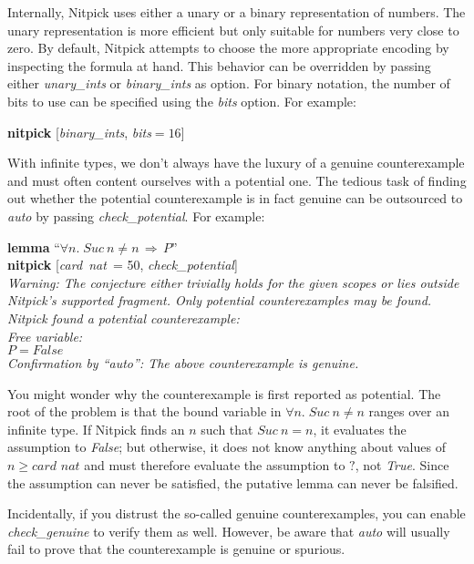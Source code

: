 \documentclass[a4paper,12pt]{article}
\def\unk{{?}}
\begin{document}
Internally, Nitpick uses either a unary or a binary representation of numbers.
The unary representation is more efficient but only suitable for numbers very
close to zero. By default, Nitpick attempts to choose the more appropriate
encoding by inspecting the formula at hand. This behavior can be overridden by
passing either \textit{unary\_ints} or \textit{binary\_ints} as option. For
binary notation, the number of bits to use can be specified using
the \textit{bits} option. For example:

\prew
\textbf{nitpick} [\textit{binary\_ints}, \textit{bits}${} = 16$]
\postw

With infinite types, we don't always have the luxury of a genuine counterexample
and must often content ourselves with a potential one. The tedious task of
finding out whether the potential counterexample is in fact genuine can be
outsourced to \textit{auto} by passing \textit{check\_potential}. For example:

\prew
\textbf{lemma} ``$\forall n.\; \textit{Suc}~n \mathbin{\not=} n \,\Longrightarrow\, P$'' \\
\textbf{nitpick} [\textit{card~nat}~= 50, \textit{check\_potential}] \\[2\smallskipamount]
\slshape Warning: The conjecture either trivially holds for the given scopes or lies outside Nitpick's supported
fragment. Only potential counterexamples may be found. \\[2\smallskipamount]
Nitpick found a potential counterexample: \\[2\smallskipamount]
\hbox{}\qquad Free variable: \nopagebreak \\
\hbox{}\qquad\qquad $P = \textit{False}$ \\[2\smallskipamount]
Confirmation by ``\textit{auto}'': The above counterexample is genuine.
\postw

You might wonder why the counterexample is first reported as potential. The root
of the problem is that the bound variable in $\forall n.\; \textit{Suc}~n
\mathbin{\not=} n$ ranges over an infinite type. If Nitpick finds an $n$ such
that $\textit{Suc}~n \mathbin{=} n$, it evaluates the assumption to
\textit{False}; but otherwise, it does not know anything about values of $n \ge
\textit{card~nat}$ and must therefore evaluate the assumption to $\unk$, not
\textit{True}. Since the assumption can never be satisfied, the putative lemma
can never be falsified.

Incidentally, if you distrust the so-called genuine counterexamples, you can
enable \textit{check\_\allowbreak genuine} to verify them as well. However, be
aware that \textit{auto} will usually fail to prove that the counterexample is
genuine or spurious.
\end{document}
